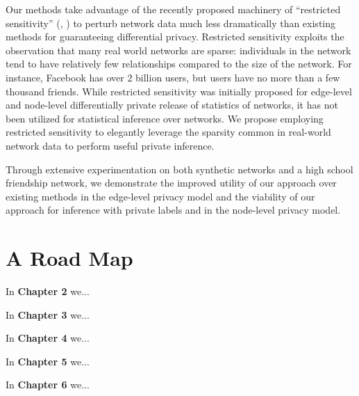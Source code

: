 Our methods take advantage of the recently proposed machinery of ``restricted sensitivity'' (\cite{BBDS13}, \cite{KNRS13}) to perturb network data much less dramatically than existing methods for guaranteeing differential privacy. Restricted sensitivity exploits the observation that many real world networks are sparse: individuals in the network tend to have relatively few relationships compared to the size of the network. For instance, Facebook has over 2 billion users, but users have no more than a few thousand friends. While restricted sensitivity was initially proposed for edge-level and node-level differentially private release of statistics of networks, it has not been utilized for statistical inference over networks. We propose employing restricted sensitivity to elegantly leverage the sparsity common in real-world network data to perform useful private inference. 

Through extensive experimentation on both synthetic networks and a high school friendship network, we demonstrate the improved utility of our approach over existing methods in the edge-level privacy model and the viability of our approach for inference with private labels and in the node-level privacy model.
 
\section{A Road Map}

In \textbf{Chapter 2} we...

In \textbf{Chapter 3} we...

In \textbf{Chapter 4} we...

In \textbf{Chapter 5} we...

In \textbf{Chapter 6} we...